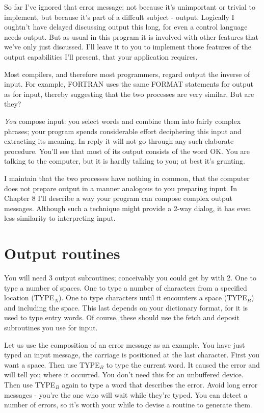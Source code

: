 \documentclass[b5paper, oneside]{book}
\begin{document}
So far I've ignored that error message; not because it's unimportant or trivial to implement, but because it's part of a diffcult subject - output. Logically I oughtn't have delayed discussing output this long, for even a control language needs output. But as usual in this program it is involved with other features that we've only just discussed. I'll leave it to you to implement those features of the output capabilities I'll present, that your application requires.

Most compilers, and therefore most programmers, regard output the inverse of input. For example, FORTRAN uses the same FORMAT statements for output as for input, thereby suggesting that the two processes are very similar. But are they?

{\em You} compose input: you select words and combine them into fairly complex phrases; your program spends considerable effort deciphering this input and extracting its meaning. In reply it will not go through any such elaborate procedure. You'll see that most of its output consists of the word OK. You are talking to the computer, but it is hardly talking to you; at best it's grunting.

I maintain that the two processes have nothing in common, that the computer does not prepare output in a manner analogous to you preparing input. In Chapter 8 I'll describe a way your program can compose complex output messages. Although such a technique might provide a 2-way dialog, it has even less similarity to interpreting input.

\section{Output routines}
You will need 3 output subroutines; conceivably you could get by with 2. One to type a number of spaces. One to type a number of characters from a specified location (TYPE$_N$). One to type characters until it encounters a space (TYPE$_B$) and including the space. This last depends on your dictionary format, for it is used to type entry words. Of course, these should use the fetch and deposit subroutines you use for input.

Let us use the composition of an error message as an example. You have just typed an input message, the carriage is positioned at the last character. First you want a space. Then use TYPE$_B$ to type the current word. It caused the error and will tell you where it occurred. You don't need this for an unbuffered device. Then use TYPE$_B$ again to type a word that describes the error. Avoid long error messages - you're the one who will wait while they're typed. You can detect a number of errors, so it's worth your while to devise a routine to generate them.
\end{document}
